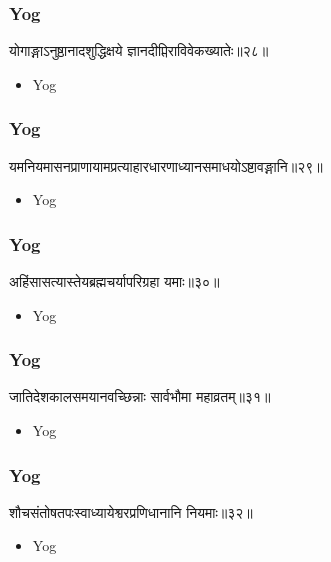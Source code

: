 \begin{frame}[fragile]\frametitle{Yog}
\begin{sanskrit}
योगाङ्गाऽनुष्ठानादशुद्धिक्षये ज्ञानदीप्तिराविवेकख्यातेः॥२८॥
\end{sanskrit}
	\begin{itemize}
	\item Yog 
	\end{itemize}
\end{frame}

\begin{frame}[fragile]\frametitle{Yog}
\begin{sanskrit}
यमनियमासनप्राणायामप्रत्याहारधारणाध्यानसमाधयोऽष्टावङ्गानि॥२९॥
\end{sanskrit}
	\begin{itemize}
	\item Yog 
	\end{itemize}
\end{frame}


\begin{frame}[fragile]\frametitle{Yog}
\begin{sanskrit}
अहिंसासत्यास्तेयब्रह्मचर्यापरिग्रहा यमाः॥३०॥
\end{sanskrit}
	\begin{itemize}
	\item Yog 
	\end{itemize}
\end{frame}


\begin{frame}[fragile]\frametitle{Yog}
\begin{sanskrit}
जातिदेशकालसमयानवच्छिन्नाः सार्वभौमा महाव्रतम्॥३१॥
\end{sanskrit}
	\begin{itemize}
	\item Yog 
	\end{itemize}
\end{frame}



\begin{frame}[fragile]\frametitle{Yog}
\begin{sanskrit}
शौचसंतोषतपःस्वाध्यायेश्वरप्रणिधानानि नियमाः॥३२॥
\end{sanskrit}
	\begin{itemize}
	\item Yog 
	\end{itemize}
\end{frame}


